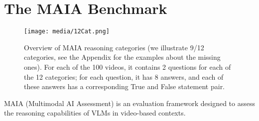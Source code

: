 \section{The MAIA Benchmark}

\begin{figure*}[h]
    \centering
  \texttt{[image: media/12Cat.png]}
  \caption{Overview of  MAIA reasoning categories (we illustrate 9/12 categories, see the Appendix for the examples about the missing ones). For each of the 100 videos, it contains 2 questions for each of the 12 categories; for each question, it has 8 answers, and each of these answers has a corresponding True and False statement pair.}
  \label{fig:MAIA_overview}
\end{figure*}


MAIA (Multimodal AI Assessment) is an evaluation framework designed to assess the reasoning  capabilities of VLMs in video-based contexts. 




 




